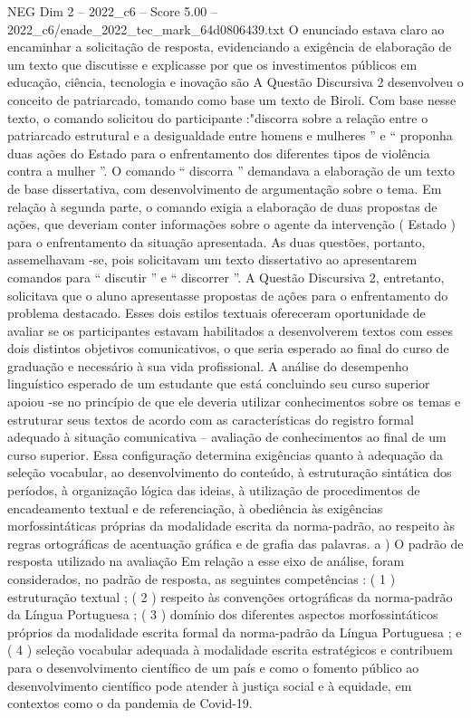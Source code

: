 \begin{textsample}{NEG Dim 2 – 2022\_c6 – Score 5.00 – 2022\_c6/enade\_2022\_tec\_mark\_64d0806439.txt}
O enunciado estava claro ao encaminhar a solicitação de resposta, evidenciando a exigência de elaboração de um texto que discutisse e explicasse por que os investimentos públicos em educação, ciência, tecnologia e inovação são A Questão Discursiva 2 desenvolveu o conceito de patriarcado, tomando como base um texto de Biroli.
Com base nesse texto, o comando solicitou do participante :"discorra sobre a relação entre o patriarcado estrutural e a desigualdade entre homens e mulheres ” e “ proponha duas ações do Estado para o enfrentamento dos diferentes tipos de violência contra a mulher ”.
O comando “ discorra ” demandava a elaboração de um texto de base dissertativa, com desenvolvimento de argumentação sobre o tema.
Em relação à segunda parte, o comando exigia a elaboração de duas propostas de ações, que deveriam conter informações sobre o agente da intervenção ( Estado ) para o enfrentamento da situação apresentada.
As duas questões, portanto, assemelhavam -se, pois solicitavam um texto dissertativo ao apresentarem comandos para “ discutir ” e “ discorrer ”.
A Questão Discursiva 2, entretanto, solicitava que o aluno apresentasse propostas de ações para o enfrentamento do problema destacado.
Esses dois estilos textuais ofereceram oportunidade de avaliar se os participantes estavam habilitados a desenvolverem textos com esses dois distintos objetivos comunicativos, o que seria esperado ao final do curso de graduação e necessário à sua vida profissional.
A análise do desempenho linguístico esperado de um estudante que está concluindo seu curso superior apoiou -se no princípio de que ele deveria utilizar conhecimentos sobre os temas e estruturar seus textos de acordo com as características do registro formal adequado à situação comunicativa – avaliação de conhecimentos ao final de um curso superior.
Essa configuração determina exigências quanto à adequação da seleção vocabular, ao desenvolvimento do conteúdo, à estruturação sintática dos períodos, à organização lógica das ideias, à utilização de procedimentos de encadeamento textual e de referenciação, à obediência às exigências morfossintáticas próprias da modalidade escrita da norma-padrão, ao respeito às regras ortográficas de acentuação gráfica e de grafia das palavras. a ) O padrão de resposta utilizado na avaliação Em relação a esse eixo de análise, foram considerados, no padrão de resposta, as seguintes competências : ( 1 ) estruturação textual ; ( 2 ) respeito às convenções ortográficas da norma-padrão da Língua Portuguesa ; ( 3 ) domínio dos diferentes aspectos morfossintáticos próprios da modalidade escrita formal da norma-padrão da Língua Portuguesa ; e ( 4 ) seleção vocabular adequada à modalidade escrita estratégicos e contribuem para o desenvolvimento científico de um país e como o fomento público ao desenvolvimento científico pode atender à justiça social e à equidade, em contextos como o da pandemia de Covid-19.

\end{textsample}
